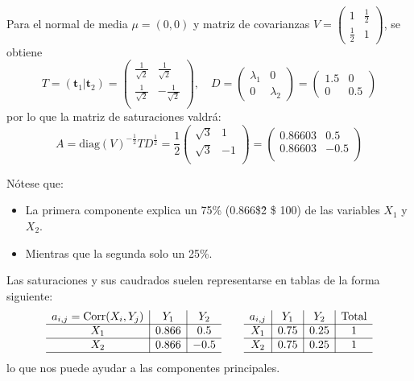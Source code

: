 Para el \vea normal de media $\mu=(0,0)$ y matriz de covarianzas $V=\begin{pmatrix}
	1 & \tfrac{1}{2}\\
	\tfrac{1}{2} & 1
\end{pmatrix}$, se obtiene \[ T=(\mathbf{t}_1|\mathbf{t}_2)=\begin{pmatrix}
\frac{1}{\sqrt{2}} & \frac{1}{\sqrt{2}}\\
\frac{1}{\sqrt{2}} & -\frac{1}{\sqrt{2}}\\
\end{pmatrix},\quad D=\begin{pmatrix}
\lambda_1 & 0\\
0 & \lambda_2
\end{pmatrix}=\begin{pmatrix}
1.5 & 0\\
0 & 0.5
\end{pmatrix} \]por lo que la matriz de saturaciones valdrá: \[ A=\mathrm{diag}(V)^{-\frac{1}{2}}TD^{\frac{1}{2}}=\dfrac{1}{2}\begin{pmatrix}
\sqrt{3} & 1\\
\sqrt{3} & -1\\
\end{pmatrix}=\begin{pmatrix}
0.86603 & 0.5\\
0.86603 & -0.5\\
\end{pmatrix} \]

Nótese que:
\begin{itemize}
	\item La primera componente explica un 75\% (0.866\$\^2 \$ 100) de las variables $X_1$ y $X_2$.
	\item Mientras que la segunda solo un 25\%.
\end{itemize}
Las saturaciones y sus caudrados suelen representarse en tablas de la forma siguiente:
\[ \begin{array}{c|c|c}
	a_{i,j}=\operatorname{Corr}(X_i,Y_j) & Y_1 & Y_2\\ \hline
	X_1 & 0.866 & 0.5\\ \hline
	X_2 & 0.866 & -0.5\\ \hline
\end{array}\qquad\begin{array}{c|c|c|c}
a_{i,j} & Y_1 & Y_2 & \text{Total}\\ \hline
X_1 & 0.75 & 0.25 & 1\\ \hline
X_2 & 0.75 & 0.25 & 1\\ \hline
\end{array} \] lo que nos puede ayudar a  las componentes principales.

